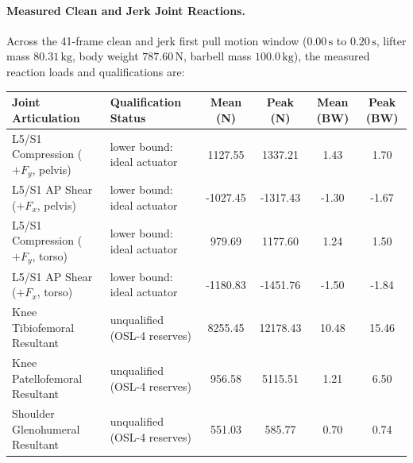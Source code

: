 \documentclass[11pt,a4paper]{article}
\begin{document}
\paragraph{Measured Clean and Jerk Joint Reactions.}
Across the 41-frame clean and jerk first pull motion window ($0.00\,\mathrm{s}$ to $0.20\,\mathrm{s}$, lifter mass $80.31\,\mathrm{kg}$, body weight $787.60\,\mathrm{N}$, barbell mass $100.0\,\mathrm{kg}$),
the measured reaction loads and qualifications are:
\begin{center}\footnotesize\setlength{\tabcolsep}{3pt}
\begin{tabular}{llcccc}
\toprule
Joint Articulation & Qualification Status & Mean (N) & Peak (N) & Mean (BW) & Peak (BW)\\
\midrule
L5/S1 Compression ($+F_y$, pelvis) & lower bound: ideal actuator & 1127.55 & 1337.21 & 1.43 & 1.70\\
L5/S1 AP Shear ($+F_x$, pelvis) & lower bound: ideal actuator & -1027.45 & -1317.43 & -1.30 & -1.67\\
L5/S1 Compression ($+F_y$, torso) & lower bound: ideal actuator & 979.69 & 1177.60 & 1.24 & 1.50\\
L5/S1 AP Shear ($+F_x$, torso) & lower bound: ideal actuator & -1180.83 & -1451.76 & -1.50 & -1.84\\
Knee Tibiofemoral Resultant & unqualified (OSL-4 reserves) & 8255.45 & 12178.43 & 10.48 & 15.46\\
Knee Patellofemoral Resultant & unqualified (OSL-4 reserves) & 956.58 & 5115.51 & 1.21 & 6.50\\
Shoulder Glenohumeral Resultant & unqualified (OSL-4 reserves) & 551.03 & 585.77 & 0.70 & 0.74\\
\bottomrule
\end{tabular}
\end{center}
\end{document}
